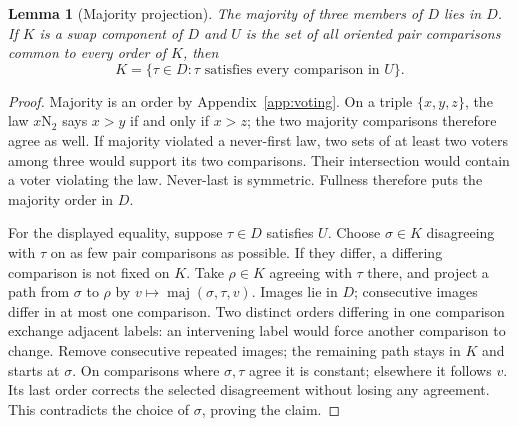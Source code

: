 \documentclass[11pt,letterpaper]{article}
\newtheorem{lemma}[theorem]{Lemma}
\theoremstyle{definition}
\newcommand{\maj}{\operatorname{maj}}
\newcommand{\N}[2]{#1\mathrm N_{#2}}
\begin{document}
\begin{lemma}[Majority projection]\label{lem:projection}
The majority of three members of \(D\) lies in \(D\).
If \(K\) is a swap component of \(D\) and \(U\) is the set of all oriented
pair comparisons common to every order of \(K\), then
\[
 K=\{\tau\in D:\tau\text{ satisfies every comparison in }U\}.
\]
\end{lemma}
\begin{proof}
Majority is an order by Appendix~\ref{app:voting}. On a triple
\(\{x,y,z\}\), the law \(\N x2\) says \(x>y\) if and only if
\(x>z\); the two majority comparisons therefore agree as well.
If majority violated a never-first law, two sets of at least two
voters among three would support its two comparisons. Their intersection
would contain a voter violating the law. Never-last is symmetric.
Fullness therefore puts the majority order in \(D\).

For the displayed equality, suppose \(\tau\in D\) satisfies \(U\).
Choose \(\sigma\in K\) disagreeing with \(\tau\) on as few pair
comparisons as possible. If they differ, a differing comparison is not
fixed on \(K\). Take \(\rho\in K\) agreeing with \(\tau\) there,
and project a path from \(\sigma\) to \(\rho\) by
\(v\mapsto\maj(\sigma,\tau,v)\). Images lie in \(D\); consecutive
images differ in at most one comparison. Two distinct orders differing
in one comparison exchange adjacent labels: an intervening label would
force another comparison to change. Remove consecutive repeated images;
the remaining path stays in \(K\) and starts at \(\sigma\). On comparisons where \(\sigma,\tau\)
agree it is constant; elsewhere it follows \(v\). Its last order
corrects the selected disagreement without losing any agreement.
This contradicts the choice of \(\sigma\), proving the claim.
\end{proof}
\end{document}
